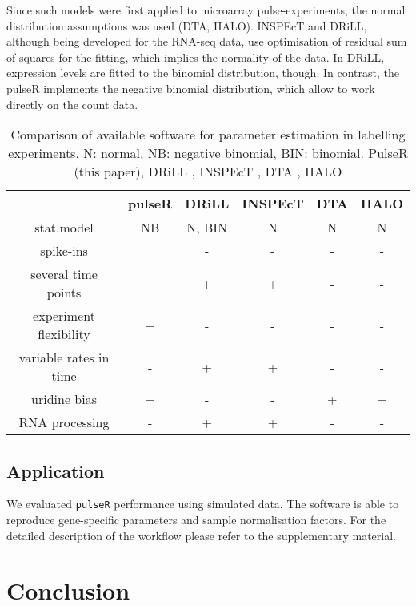 Since such models were first applied to microarray pulse-experiments,
the normal distribution assumptions was used (DTA, HALO).
INSPEcT and DRiLL, although being developed for the RNA-seq data,
use optimisation of residual sum of squares for the fitting, which 
implies the normality of the data. In DRiLL, expression levels are fitted
to the binomial distribution, though.
In contrast, the pulseR implements the negative binomial distribution,
which allow to work directly on the count data.
\begin{table}
 \begin{tabular}{|c|c|c|c|c|c|}\hline
                        &pulseR &DRiLL          &INSPEcT&DTA    &HALO       \\\hline
 stat.model             & NB    &N, BIN         &N       & N     &N      \\\hline                         
 spike-ins              & +     &   -           &  -     &  -    & -         \\\hline               
 several time points    & +     &    +          &  +     &  -    & -         \\\hline                    
 experiment flexibility & +     &   -           &  -     &  -    & -         \\\hline 
 variable rates in time &  -    &    +          &  +     &  -    & -         \\\hline 
            uridine bias& +     &   -           &  -     &  +    & +         \\\hline 
       RNA processing   & -     &    +          &  +     &  -    & -         \\\hline 
 \end{tabular}
\caption{Comparison of available software for parameter estimation in 
labelling experiments. N: normal, NB: negative binomial, BIN: binomial.
PulseR (this paper), 
DRiLL \citep{rabani2014high},
INSPEcT \citep{de2015inspect},
DTA \citep{schwalb2012measurement},
HALO \citep{friedel2010halo}
}
\end{table}

\subsection{Application}
We evaluated \verb|pulseR| performance using simulated data. 
The software is able to reproduce gene-specific parameters and 
sample normalisation factors.
For the detailed
description of the workflow please refer to the supplementary material.

\section{Conclusion}